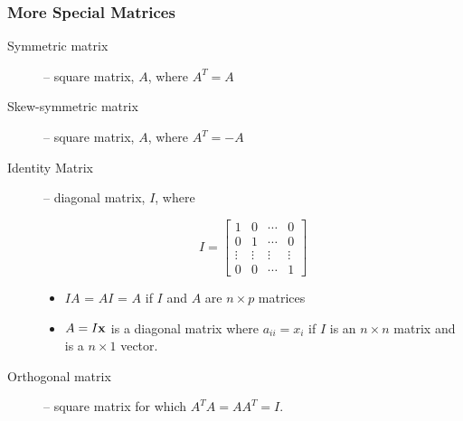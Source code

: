 \documentclass{beamer}
\begin{document}


\begin{frame}
  \frametitle{More Special Matrices}

\begin{description}

\item[Symmetric matrix] -- square matrix, $A$, where $A^T = A$

\item[Skew-symmetric matrix] -- square matrix, $A$, where $A^T = -A$

\item[Identity Matrix] -- diagonal matrix, $I$, where

\[
I = \left[ \begin{array}{cccc}

1 & 0 & \cdots & 0 \\
0 & 1 & \cdots & 0 \\
\vdots & \vdots & \vdots & \vdots \\
0 & 0 & \cdots & 1
\end{array}
\right]
\]

\begin{itemize}
 \item $IA$ = $AI$ = $A$ if $I$ and $A$ are  $n \times p$ matrices
 \item $A = I\mathbf{x}$ is a diagonal matrix where $a_{ii} = x_i$ if $I$ is an $n \times n$ matrix and  is a $n \times 1$ vector.

\end{itemize}

\item[Orthogonal matrix] -- square matrix for which $A^T A = A A^T = I$.

\end{description}

\end{frame}
\end{document}
